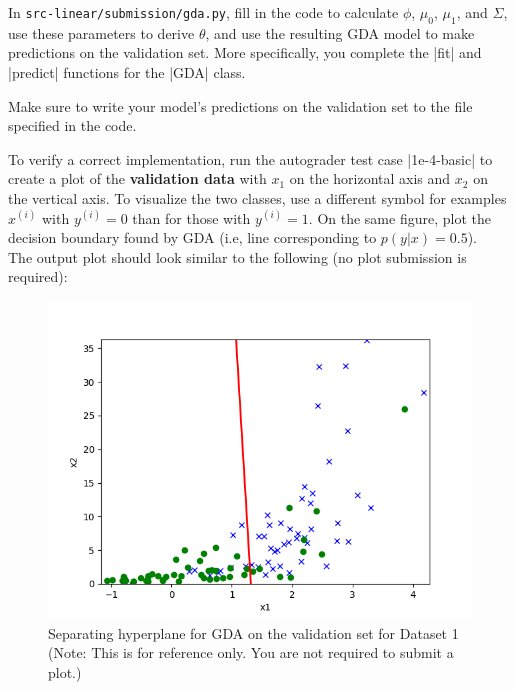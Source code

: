 \item {}
In \texttt{src-linear/submission/gda.py}, fill in the code to calculate $\phi$, $\mu_{0}$, $\mu_{1}$, and $\Sigma$, use these parameters to derive $\theta$, and use the resulting GDA model to make predictions on the validation set. More specifically, you complete the |fit| and |predict| functions for the |GDA| class.

Make sure to write your model's predictions on the validation set to the file specified in the code. 

To verify a correct implementation, run the autograder test case |1e-4-basic| to create a plot of the \textbf{validation data} with $x_1$ on the horizontal axis and $x_2$ on the vertical axis. To visualize the two classes, use a different symbol for examples $x^{(i)}$ with $y^{(i)} = 0$ than for those with $y^{(i)} = 1$. On the same figure, plot the decision boundary found by GDA (i.e, line corresponding to $p(y\vert x) = 0.5$).\\

The output plot should look similar to the following (no plot submission is required): 

\begin{figure}[H]
	\centering
	\vspace{2mm}
	\includegraphics[width=0.65\linewidth]{01-linearclass/p01e_pred_1.png}
    \caption{Separating hyperplane for GDA on the validation set for Dataset 1 (Note: This is for reference only.  You are not required to submit a plot.)}
\end{figure}
